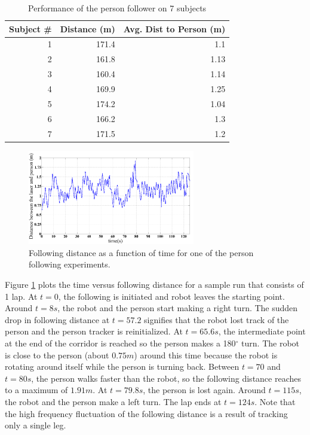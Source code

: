 \documentclass{tADR2e}
\begin{document}
\begin{table}[!h]
\begin{center}
  \begin{tabular}{| r || r | r |}
    \hline
    Subject \# & Distance (m) & Avg. Dist to Person (m) \\ \hline 
    1 & 171.4  & 1.1\\ \hline
    2 & 161.8  & 1.13\\ \hline
    3 & 160.4  & 1.14\\ \hline
    4 & 169.9  & 1.25\\ \hline
    5 & 174.2  & 1.04\\ \hline
    6 & 166.2  & 1.3\\ \hline
    7 & 171.5  & 1.2\\ \hline
  \end{tabular}
\label{tab:perf}
\end{center}
\caption {Performance of the person follower on 7 subjects}
\end{table}


\begin{figure}[ht!]
\centering
\includegraphics[width=0.65\textwidth]{pics/following_result}
\caption{Following distance as a function of time for one of the person following experiments.}
\label{fig:graph}
\end{figure}

Figure \ref{fig:graph} plots the time versus following distance for a sample run that consists of 1 lap. At $t=0$, the following is initiated and robot leaves the starting point. Around $t=8s$, the robot and the person start making a right turn. The sudden drop in following distance at $t=57.2$ signifies that the robot lost track of the person and the person tracker is reinitialized. At $t=65.6s$, the intermediate point at the end of the corridor is reached so the person makes a 180$^\circ$ turn. The robot is close to the person (about $0.75m$) around this time because the robot is rotating around itself while the person is turning back. Between $t=70$ and $t=80s$, the person walks faster than the robot, so the following distance reaches to a maximum of $1.91m$. At $t=79.8s$, the person is lost again. Around $t=115s$, the robot and the person make a left turn. The lap ends at $t=124s$. Note that the high frequency fluctuation of the following distance is a result of tracking only a single leg.
\end{document}
